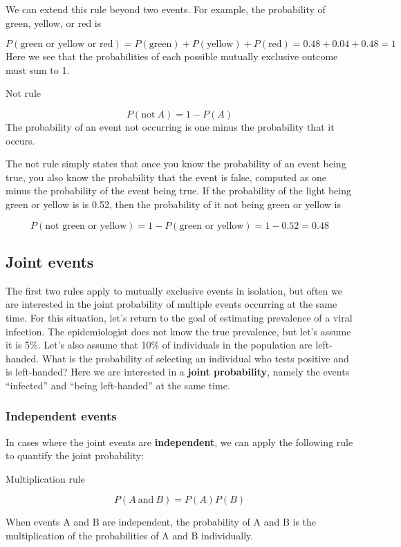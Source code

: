 \documentclass[
]{book}
\begin{document}
We can extend this rule beyond two events. For example, the probability of green, yellow, or red is

\[
P(\text{green or yellow or red})= P(\text{green}) + P(\text{yellow}) + P(\text{red}) = 0.48 + 0.04 + 0.48= 1
\] Here we see that the probabilities of each possible mutually exclusive outcome must sum to 1.

Not rule

\[
P(\text{not}\ A) = 1 - P(A)
\] The probability of an event not occurring is one minus the probability that it occurs.

The not rule simply states that once you know the probability of an event being true, you also know the probability that the event is false, computed as one minus the probability of the event being true. If the probability of the light being green or yellow is is 0.52, then the probability of it not being green or yellow is

\[
P(\text{not green or yellow}) = 1 - P(\text{green or yellow}) = 1 - 0.52 = 0.48
\]

\subsection{Joint events}\label{joint-events}

The first two rules apply to mutually exclusive events in isolation, but often we are interested in the joint probability of multiple events occurring at the same time. For this situation, let's return to the goal of estimating prevalence of a viral infection. The epidemiologist does not know the true prevalence, but let's assume it is 5\%. Let's also assume that 10\% of individuals in the population are left-handed. What is the probability of selecting an individual who tests positive and is left-handed? Here we are interested in a \textbf{joint probability}, namely the events ``infected'' and ``being left-handed'' at the same time.

\subsubsection{Independent events}\label{independent-events}

In cases where the joint events are \textbf{independent}, we can apply the following rule to quantify the joint probability:

Multiplication rule

\[
P(A\ \text{and}\ B) = P(A)P(B)
\]

When events A and B are independent, the probability of A and B is the multiplication of the probabilities of A and B individually.
\end{document}
